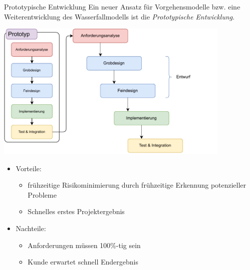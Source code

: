 \begin{defi}{Prototypische Entwicklung}
    Ein neuer Ansatz für Vorgehensmodelle bzw. eine Weiterentwicklung des Wasserfallmodells ist die \emph{Prototypische Entwicklung}.

    \begin{center}
        \includegraphics[width=0.85\textwidth]{includes/figures/01_prototype_development.pdf}
    \end{center}

    \begin{itemize}
        \item Vorteile:
              \begin{itemize}
                  \item frühzeitige Risikominimierung durch frühzeitige Erkennung potenzieller Probleme
                  \item Schnelles erstes Projektergebnis
              \end{itemize}
        \item Nachteile:
              \begin{itemize}
                  \item Anforderungen müssen 100\%-tig sein
                  \item Kunde erwartet schnell Endergebnis
              \end{itemize}
    \end{itemize}
\end{defi}

